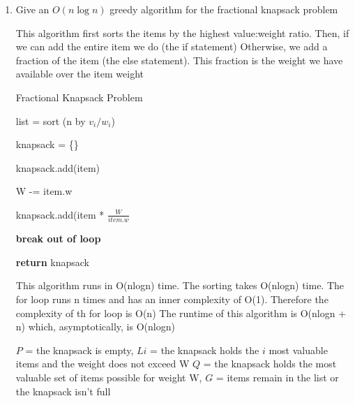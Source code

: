 \documentclass{article}
\begin{document}
\begin{enumerate}

    \item Give an $O(n\log n)$ greedy algorithm for the fractional knapsack problem
      

This algorithm first sorts the items by the highest value:weight ratio. Then, if we can add the entire item we do (the if statement)
 Otherwise, we add a fraction of the item (the else statement). This fraction is the weight we have available over the item weight


\begin{algorithm}

    \caption{Fractional Knapsack Problem}\label{fracKnap}

    \begin{algorithmic}[1]


      \State list = sort (n by $v_i/w_i$)

      \State knapsack = \{\}



      		\State knapsack.add(item)

      		\State W -= item.w

      	\Else

      		\State knapsack.add(item * $\frac{W}{item.w}$

      		\State \textbf{break out of loop}

      	\EndIf

      \EndFor

      \State \textbf{return} knapsack

    \EndFunction

    \end{algorithmic}

\end{algorithm} 



This algorithm runs in O(nlogn) time. The sorting takes O(nlogn) time. The for loop runs n times
 and has an inner complexity of O(1). Therefore the complexity of th for loop is O(n)
 The runtime of this algorithm is O(nlogn + n) which, asymptotically, is O(nlogn)


$P$ = the knapsack is empty, $Li$ = the knapsack holds the $i$ most valuable items and the weight does not exceed W
 $Q$ = the knapsack holds the most valuable set of items possible for weight W, $G$ = items remain in the list
 or the knapsack isn't full


\end{enumerate}
\end{document}
